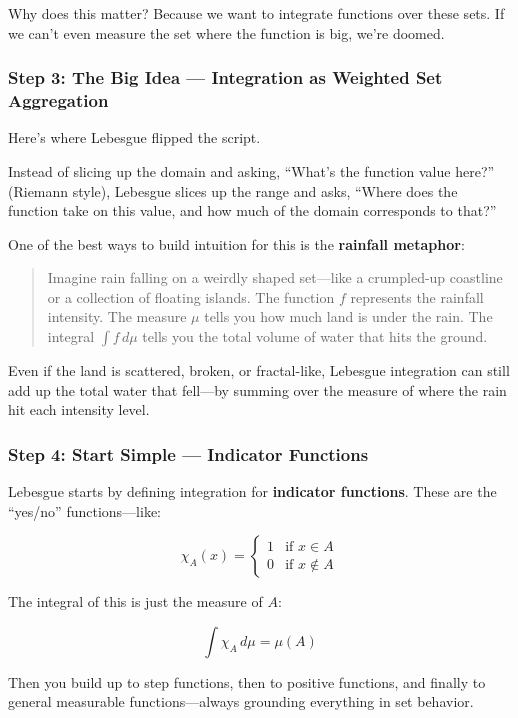 Why does this matter? Because we want to integrate functions over these sets. If we can't even measure the set where the function is big, we’re doomed.

\subsubsection{Step 3: The Big Idea — Integration as Weighted Set Aggregation}

Here’s where Lebesgue flipped the script.

Instead of slicing up the domain and asking, “What’s the function value here?” (Riemann style), Lebesgue slices up the range and asks, “Where does the function take on this value, and how much of the domain corresponds to that?”

One of the best ways to build intuition for this is the \textbf{rainfall metaphor}:

\begin{quote}
Imagine rain falling on a weirdly shaped set—like a crumpled-up coastline or a collection of floating islands. The function \( f \) represents the rainfall intensity. The measure \( \mu \) tells you how much land is under the rain. The integral \( \int f\,d\mu \) tells you the total volume of water that hits the ground.
\end{quote}

Even if the land is scattered, broken, or fractal-like, Lebesgue integration can still add up the total water that fell—by summing over the measure of where the rain hit each intensity level.

\subsubsection{Step 4: Start Simple — Indicator Functions}

Lebesgue starts by defining integration for \textbf{indicator functions}. These are the “yes/no” functions—like:

\[
\chi_A(x) =
\begin{cases}
1 & \text{if } x \in A \\
0 & \text{if } x \notin A
\end{cases}
\]

The integral of this is just the measure of \( A \):

\[
\int \chi_A \, d\mu = \mu(A)
\]

Then you build up to step functions, then to positive functions, and finally to general measurable functions—always grounding everything in set behavior.

